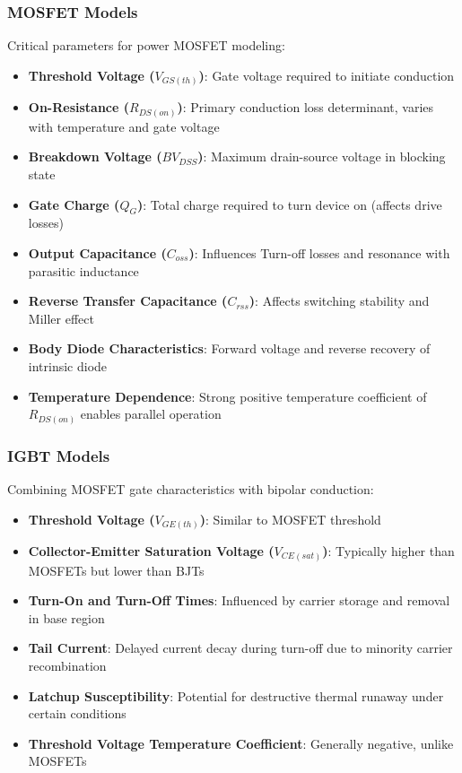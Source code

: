 \subsubsection{MOSFET Models}
Critical parameters for power MOSFET modeling:
\begin{itemize}
    \item \textbf{Threshold Voltage ($V_{GS(th)}$)}: Gate voltage required to initiate conduction
    \item \textbf{On-Resistance ($R_{DS(on)}$)}: Primary conduction loss determinant, varies with temperature and gate voltage
    \item \textbf{Breakdown Voltage ($BV_{DSS}$)}: Maximum drain-source voltage in blocking state
    \item \textbf{Gate Charge ($Q_G$)}: Total charge required to turn device on (affects drive losses)
    \item \textbf{Output Capacitance ($C_{oss}$)}: Influences Turn-off losses and resonance with parasitic inductance
    \item \textbf{Reverse Transfer Capacitance ($C_{rss}$)}: Affects switching stability and Miller effect
    \item \textbf{Body Diode Characteristics}: Forward voltage and reverse recovery of intrinsic diode
    \item \textbf{Temperature Dependence}: Strong positive temperature coefficient of $R_{DS(on)}$ enables parallel operation
\end{itemize}

\subsubsection{IGBT Models}
Combining MOSFET gate characteristics with bipolar conduction:
\begin{itemize}
    \item \textbf{Threshold Voltage ($V_{GE(th)}$)}: Similar to MOSFET threshold
    \item \textbf{Collector-Emitter Saturation Voltage ($V_{CE(sat)}$)}: Typically higher than MOSFETs but lower than BJTs
    \item \textbf{Turn-On and Turn-Off Times}: Influenced by carrier storage and removal in base region
    \item \textbf{Tail Current}: Delayed current decay during turn-off due to minority carrier recombination
    \item \textbf{Latchup Susceptibility}: Potential for destructive thermal runaway under certain conditions
    \item \textbf{Threshold Voltage Temperature Coefficient}: Generally negative, unlike MOSFETs
\end{itemize}

